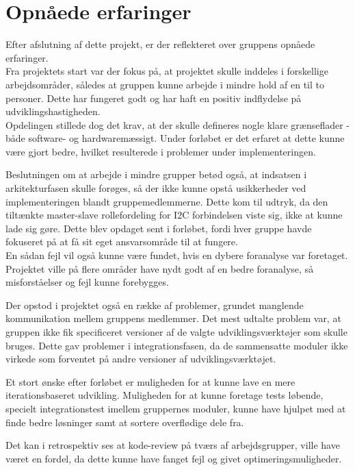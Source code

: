 %

%

\chapter{Opnåede erfaringer}
Efter afslutning af dette projekt, er der reflekteret over gruppens opnåede erfaringer. \\
Fra projektets start var der fokus på, at projektet skulle inddeles i forskellige arbejdsområder, således at gruppen kunne arbejde i mindre hold af en til to personer. 
Dette har fungeret godt og har haft en positiv indflydelse på udviklingshastigheden. \\
Opdelingen stillede dog det krav, at der skulle defineres nogle klare grænseflader - både software- og hardwaremæssigt. 
Under forløbet er det erfaret at dette kunne være gjort bedre, hvilket resulterede i problemer under implementeringen.

Beslutningen om at arbejde i mindre grupper betød også, at indsatsen i  arkitekturfasen skulle forøges, så der ikke kunne opstå usikkerheder ved implementeringen blandt gruppemedlemmerne.
Dette kom til udtryk, da den tiltænkte master-slave rollefordeling for I2C forbindelsen viste sig, ikke at kunne lade sig gøre. 
Dette blev opdaget sent i forløbet, fordi hver gruppe havde fokuseret på at få sit eget ansvarsområde til at fungere. \\
En sådan fejl vil også kunne være fundet, hvis en dybere foranalyse var foretaget. Projektet ville på flere områder have nydt godt af en bedre foranalyse, så misforståelser og fejl kunne forebygges.

Der opstod i projektet også en række af problemer, grundet manglende kommunikation mellem gruppens medlemmer.
Det mest udtalte problem var, at gruppen ikke fik specificeret versioner af de valgte udviklingsværktøjer som skulle bruges. 
Dette gav problemer i integrationsfasen, da de sammensatte moduler ikke virkede som forventet på andre versioner af udviklingsværktøjet.

Et stort ønske efter forløbet er muligheden for at kunne lave en mere iterationsbaseret udvikling. 
Muligheden for at kunne foretage tests løbende, specielt integrationstest imellem gruppernes moduler, kunne have hjulpet med at finde bedre løsninger samt at sortere overflødige dele fra.

Det kan i retrospektiv ses at kode-review på tværs af arbejdsgrupper, ville have været en fordel, da dette kunne have fanget fejl og givet optimeringsmuligheder.

%
